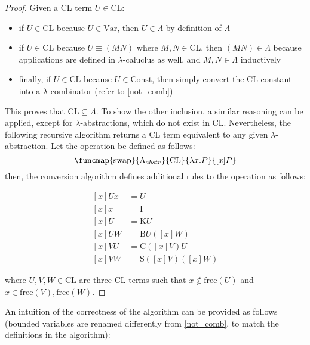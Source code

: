 \documentclass[a4paper, 12pt]{report}
\begin{document}
    \begin{proof}
        Given a CL term $U \in \mathrm{CL}$:

        \begin{itemize}
            \item if $U \in \mathrm{CL}$ because $U \in \mathrm{Var}$, then $U \in \Lambda$ by definition of $\Lambda$
            \item if $U \in \mathrm{CL}$ because $U \equiv (MN)$ where $M, N \in \mathrm{CL}$, then $(MN) \in \Lambda$ because applications are defined in $\lambda$-caluclus as well, and $M, N \in \Lambda$ inductively
            \item finally, if $U \in \mathrm{CL}$ because $U \in \mathrm{Const}$, then simply convert the CL constant into a $\lambda$-combinator (refer to \cref{not_comb})
        \end{itemize}

        This proves that $\mathrm{CL} \subseteq \Lambda$. To show the other inclusion, a similar reasoning can be applied, except for $\lambda$-abstractions, which do not exist in CL. Nevertheless, the following recursive algorithm returns a CL term equivalent to any given $\lambda$-abstraction. Let the  operation be defined as follows: $$\funcmap{\mathrm{swap}}{\Lambda_{abstr}}{\mathrm{CL}}{\lambda x. P}{[x]P}$$ then, the conversion algorithm defines additional rules to the  operation as follows:

        \begin{equation*}
            \begin{split}
                [x]Ux &= U \\
                [x]x &= \mathrm I \\
                [x]U &= \mathrm KU \\
                [x]UW &= \mathrm BU([x]W) \\
                [x]VU &= \mathrm C([x]V)U \\
                [x]VW &= \mathrm S([x]V)([x]W)
            \end{split}
        \end{equation*}

        where $U, V, W \in \mathrm{CL}$ are three CL terms such that $x \notin \mathrm{free}(U)$ and $x \in \mathrm{free}(V), \mathrm{free}(W)$.
    \end{proof}

    An intuition of the correctness of the algorithm can be provided as follows (bounded variables are renamed differently from \cref{not_comb}, to match the definitions in the algorithm):
\end{document}
